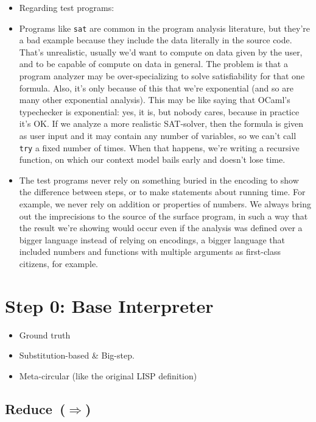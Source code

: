 \documentclass[12pt, oneside]{book}
\begin{document}
\begin{itemize}
  \item Regarding test programs:
  \item Programs like \texttt{sat} are common in the program analysis literature, but they’re a bad example because they include the data literally in the source code. That’s unrealistic, usually we’d want to compute on data given by the user, and to be capable of compute on data in general. The problem is that a program analyzer may be over-specializing to solve satisfiability for that one formula. Also, it’s only because of this that we’re exponential (and so are many other exponential analysis). This may be like saying that OCaml’s typechecker is exponential: yes, it is, but nobody cares, because in practice it’s OK. If we analyze a more realistic SAT-solver, then the formula is given as user input and it may contain any number of variables, so we can’t call \texttt{try} a fixed number of times. When that happens, we’re writing a recursive function, on which our context model bails early and doesn’t lose time.
  \item The test programs never rely on something buried in the encoding to show the difference between steps, or to make statements about running time. For example, we never rely on addition or properties of numbers. We always bring out the imprecisions to the source of the surface program, in such a way that the result we’re showing would occur even if the analysis was defined over a bigger language instead of relying on encodings, a bigger language that included numbers and functions with multiple arguments as first-class citizens, for example.
\end{itemize}

\section{Step 0: Base Interpreter}

\begin{itemize}
  \item Ground truth
  \item Substitution-based \& Big-step.
  \item Meta-circular (like the original LISP definition)
\end{itemize}

\subsection{Reduce~(\(⇒\))}
\end{document}
